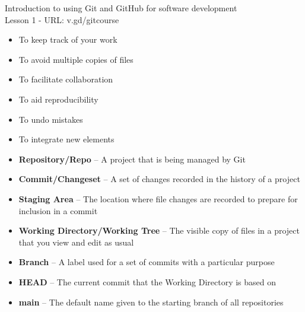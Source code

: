 \documentclass[9pt]{extarticle}
\def\itempad{-1pt}
\begin{document}
\thispagestyle{empty}

\begin{center}
  {\LARGE
  Introduction to using Git and GitHub for software development\\Lesson 1 - URL: v.gd/gitcourse}
\end{center}

\begin{navybox}[title=Why use version control?]
  \begin{multicols}{2}
    \begin{itemize}
      \itemsep\itempad
    \item To keep track of your work
    \item To avoid multiple copies of files
    \item To facilitate collaboration
    \item To aid reproducibility
    \item To undo mistakes
    \item To integrate new elements
    \end{itemize}
  \end{multicols}
\end{navybox}

\begin{bluebox}[title=Git Glossary]
  \begin{itemize}
    \itemsep\itempad
  \item \textbf{Repository/Repo} -- A project that is being managed by Git
  \item \textbf{Commit/Changeset} -- A set of changes recorded in the history of
    a project
  \item \textbf{Staging Area} -- The location where file changes are recorded to
    prepare for inclusion in a commit
  \item \textbf{Working Directory/Working Tree} -- The visible copy of files in a
    project that you view and edit as usual
  \item \textbf{Branch} -- A label used for a set of commits with a particular
    purpose
  \item \textbf{HEAD} -- The current commit that the Working Directory is based on
  \item \textbf{main} -- The default name given to the starting branch of all repositories
  \end{itemize}
\end{bluebox}
\end{document}
